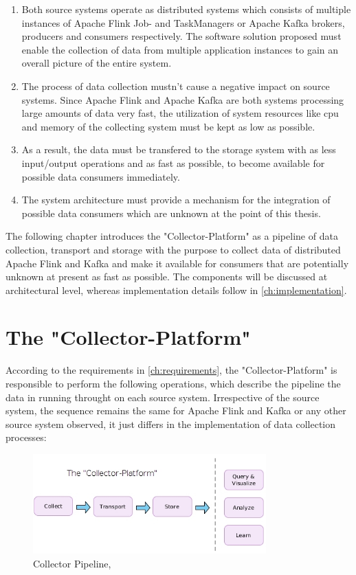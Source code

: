 \begin{enumerate}
    \item Both source systems operate as distributed systems which consists of multiple instances of Apache
    Flink Job- and TaskManagers or Apache Kafka brokers, producers and consumers respectively. The software solution proposed
    must enable the collection of data from multiple application instances to gain an overall picture of the entire system.
    \item The process of data collection mustn't cause a negative impact on source systems. Since Apache Flink and Apache Kafka
    are both systems processing large amounts of data very fast, the utilization of system resources like cpu and memory of the
    collecting system must be kept as low as possible.
    \item As a result, the data must be transfered to the storage system with as less input/output operations and as fast
    as possible, to become available for possible data consumers immediately.
    \item The system architecture must provide a mechanism for the integration of possible data consumers which are unknown at
    the point of this thesis.
\end{enumerate}

The following chapter introduces the "Collector-Platform" as a pipeline of data collection, transport and storage with the purpose
to collect data of distributed Apache Flink and Kafka and make it available for consumers that are potentially unknown at present
as fast as possible. The components will be discussed at architectural level, whereas implementation details follow in \autoref{ch:implementation}.

\section{The "Collector-Platform"}

According to the requirements in \autoref{ch:requirements}, the "Collector-Platform" is responsible to perform the
following operations, which describe the pipeline the data in running throught on each source system. Irrespective of the source system,
the sequence remains the same for Apache Flink and Kafka or any other source system observed, it just differs in the implementation of
data collection processes:

\begin{figure}[H]
	\centering
	\includegraphics[width=0.8\textwidth]{../images/06-collect-pipeline.jpg}
	\caption{Collector Pipeline, \cite{VanL14}}
	\label{fig:colletor-pipeline}
\end{figure}

